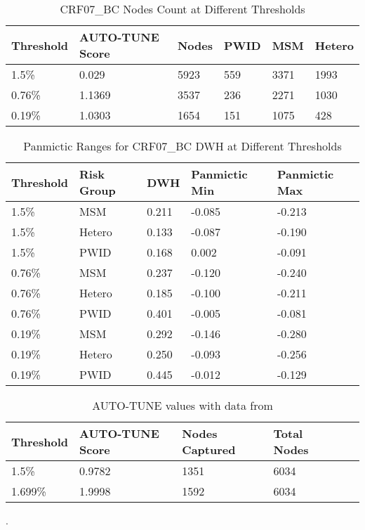 \documentclass[utf8]{FrontiersinHarvard} %
\begin{document}
\begin{table}[h!]
\centering
\begin{tabularx}{\textwidth}{|X|X|X|X|X|X|}
\hline
Threshold & AUTO-TUNE Score & Nodes & PWID & MSM & Hetero \\
\hline
1.5\% & 0.029 & 5923 & 559 & 3371 & 1993 \\
0.76\% & 1.1369 & 3537 & 236 & 2271 & 1030 \\
0.19\% & 1.0303 & 1654 & 151 & 1075 & 428 \\
\hline
\end{tabularx}
\caption{CRF07\_BC Nodes Count at Different Thresholds}
\label{table:combined}
\end{table}

\begin{table}[h!]
\centering
\begin{tabularx}{\textwidth}{|X|X|X|X|X|}
\hline
Threshold & Risk Group & DWH & Panmictic Min & Panmictic Max \\
\hline
1.5\% & MSM & 0.211 & -0.085 & -0.213 \\
1.5\% & Hetero & 0.133 & -0.087 & -0.190 \\
1.5\% & PWID & 0.168 & 0.002 & -0.091 \\
\hline
0.76\% & MSM & 0.237 & -0.120 & -0.240 \\
0.76\% & Hetero & 0.185 & -0.100 & -0.211 \\
0.76\% & PWID & 0.401 & -0.005 & -0.081 \\
\hline
0.19\% & MSM & 0.292 & -0.146 & -0.280 \\
0.19\% & Hetero & 0.250 & -0.093 & -0.256 \\
0.19\% & PWID & 0.445 & -0.012 & -0.129 \\
\hline
\end{tabularx}
\caption{Panmictic Ranges for CRF07\_BC DWH at Different Thresholds}
\label{table:panmictic}
\end{table}

\begin{table}[h!]
\centering
\begin{tabularx}{\textwidth}{|X|X|X|X|X|X|}
\hline
Threshold & AUTO-TUNE Score & Nodes Captured & Total Nodes \\
\hline
1.5\% & 0.9782 & 1351 & 6034 \\
1.699\% & 1.9998 & 1592 & 6034 \\
\hline
\end{tabularx}
\caption{AUTO-TUNE values with data from \cite{rhee_national_2019}}.
\label{table:rhee}
\end{table}
\end{document}
